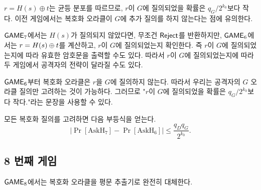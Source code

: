 $r = H(s) \oplus t$는 균등 분포를 따르므로, $r$이 $G$에 질의되었을 확률은 $q_G /
2^{k_0}$보다 작다. 이전 게임에서는 복호화 오라클이 $G$에 추가 질의를 하지 않는다는
점에 유의한다. 

\begin{memo}
	$\textsf{GAME}_7$에서는 $H(s)$가 질의되지 않았다면, 무조건 $\textsf{Reject}$를 반환하지만,
	$\textsf{GAME}_6$에서는 $r = H(s) \oplus t$를 계산하고, $r$이 $G$에 질의되었는지
	확인한다. 즉 $r$이 $G$에 질의되었는지에 따라 유효한 암호문을 출력할 수도
	있다. 따라서 $r$이 $G$에 질의되었는지에 따라 두 게임에서 공격자의 전략이
	달라질 수도 있다.
\end{memo}

\begin{memo}
	$\textsf{GAME}_6$부터 복호화 오라클은 $r$을 $G$에 질의하지 않는다. 따라서 우리는
	공격자의 $G$ 오라클 질의만 고려하는 것이 가능하다. 그러므로 "$r$이 $G$에
	질의되었을 확률은 $q_G / 2^{k_0}$보다 작다."라는 문장을 사용할 수 있다.
\end{memo}

모든 복호화 질의를 고려하면 다음 부등식을 얻는다.
$$
	\left| \Pr[\text{AskH}_7] - \Pr[\text{AskH}_6] \right| \leq \frac{q_D q_G}{2^{k_0}}.
$$

\subsection{8 번째 게임}

$\textsf{GAME}_8$에서는 복호화 오라클을 평문 추출기로 완전히 대체한다.